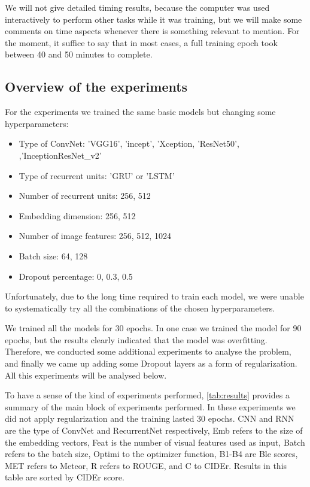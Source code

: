 We will not give detailed timing results, because the computer was used interactively to perform other tasks while it was training, but we will make some comments on time aspects whenever there is something relevant to mention. For the moment, it suffice to say that in most cases, a full training epoch took between 40 and 50 minutes to complete.

\subsection{Overview of the experiments}

For the experiments we trained the same basic models but changing some hyperparameters:

\begin{itemize}
    \item Type of ConvNet: 'VGG16', 'incept', 'Xception, 'ResNet50', ,'InceptionResNet\_v2'
    \item Type of recurrent units: 'GRU' or 'LSTM'
    \item Number of recurrent units: 256, 512
    \item Embedding dimension: 256, 512
    \item Number of image features: 256, 512, 1024
    \item Batch size: 64, 128
    \item Dropout percentage: 0, 0.3, 0.5
\end{itemize}

Unfortunately, due to the long time required to train each model, we were unable to systematically try all the combinations of the chosen hyperparameters. 

We trained all the models for 30 epochs. In one case we trained the model for 90 epochs, but the results clearly indicated that the model was overfitting.  Therefore, we conducted some additional experiments to analyse the problem, and finally we came up adding some Dropout layers as a form of regularization.  All this experiments will be analysed below.

To have a sense of the kind of experiments performed, \cref{tab:results} provides a summary of the main block of experiments performed. In these experiments we did not apply regularization and the training lasted 30 epochs. CNN and RNN are the type of ConvNet and RecurrentNet respectively, Emb refers to the size of the embedding vectors, Feat is the number of visual features used as input, Batch refers to the batch size, Optimi to the optimizer function, B1-B4 are Ble scores, MET refers to Meteor, R refers to ROUGE, and C to CIDEr. Results in this table are sorted by CIDEr score.

